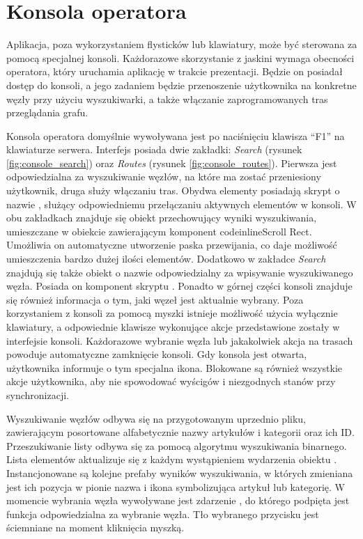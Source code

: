 \section{Konsola operatora}
\label{sec:konsola_operatora}
Aplikacja, poza wykorzystaniem flysticków lub klawiatury, może być sterowana za pomocą specjalnej konsoli. Każdorazowe skorzystanie z jaskini wymaga obecności operatora, który uruchamia aplikację w trakcie prezentacji. Będzie on posiadał dostęp do konsoli, a jego zadaniem będzie przenoszenie użytkownika na konkretne węzły przy użyciu wyszukiwarki, a także włączanie zaprogramowanych tras przeglądania grafu. 

Konsola operatora domyślnie wywoływana jest po naciśnięciu klawisza ``F1'' na klawiaturze serwera. Interfejs posiada dwie zakładki: \textit{Search} (rysunek \ref{fig:console_search}) oraz \textit{Routes} (rysunek \ref{fig:console_routes}). Pierwsza jest odpowiedzialna za wyszukiwanie węzłów, na które ma zostać przeniesiony użytkownik, druga służy włączaniu tras. Obydwa elementy posiadają skrypt o nazwie , służący odpowiedniemu przełączaniu aktywnych elementów w konsoli. W obu zakładkach znajduje się obiekt przechowujący wyniki wyszukiwania, umieszczane w obiekcie zawierającym komponent codeinline{Scroll Rect}. Umożliwia on automatyczne utworzenie paska przewijania, co daje możliwość umieszczenia bardzo dużej ilości elementów. Dodatkowo w zakładce \textit{Search} znajdują się także obiekt o nazwie  odpowiedzialny za wpisywanie wyszukiwanego węzła. Posiada on komponent skryptu . Ponadto w górnej części konsoli znajduje się również informacja o tym, jaki węzeł jest aktualnie wybrany. Poza korzystaniem z konsoli za pomocą myszki istnieje możliwość użycia wyłącznie klawiatury, a odpowiednie klawisze wykonujące akcje przedstawione zostały w interfejsie konsoli. Każdorazowe wybranie węzła lub jakakolwiek akcja na trasach powoduje automatyczne zamknięcie konsoli. Gdy konsola jest otwarta, użytkownika informuje o tym specjalna ikona. Blokowane są również wszystkie akcje użytkownika, aby nie spowodować wyścigów i niezgodnych stanów przy synchronizacji.


Wyszukiwanie węzłów odbywa się na przygotowanym uprzednio pliku, zawierającym posortowane alfabetycznie nazwy artykułów i kategorii oraz ich ID. Przeszukiwanie listy odbywa się za pomocą algorytmu wyszukiwania binarnego. Lista elementów aktualizuje się z każdym wystąpieniem wydarzenia  obiektu . Instancjonowane są kolejne prefaby wyników wyszukiwania, w których zmieniana jest ich pozycja w pionie nazwa i ikona symbolizująca artykuł lub kategorię. W momencie wybrania węzła wywoływane jest zdarzenie , do którego podpięta jest funkcja  odpowiedzialna za wybranie węzła. Tło wybranego przycisku jest ściemniane na moment kliknięcia myszką.

